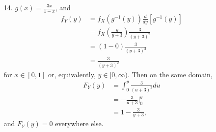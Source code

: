 \documentclass[a4paper,12pt]{article}
\begin{document}
\begin{enumerate}
    \item[14.] 
        $g(x) = \frac{3x}{1 - x}$, and
        \begin{align*}
            f_Y(y) &= f_X(g^{-1}(y)) \frac{d}{dy}[g^{-1}(y)] \\
            &= f_X \left( \frac{y}{y + 3} \right) \frac{3}{(y + 3)^2} \\
            &= (1 - 0) \frac{3}{(y + 3)^2} \\
            &= \frac{3}{(y + 3)^2}
        \end{align*}
        for $x \in [0, 1]$ or, equivalently, $y \in [0, \infty)$. Then on the same domain,
        \begin{align*}
            F_Y(y) &= \int_{0}^{y} \frac{3}{(u + 3)^2} du \\
            &= -\frac{3}{u + 3} \biggr\rvert_{0}^y \\
            &= 1 - \frac{3}{y + 3},
        \end{align*}
        and $F_Y(y) = 0$ everywhere else.

\end{enumerate}
\end{document}
